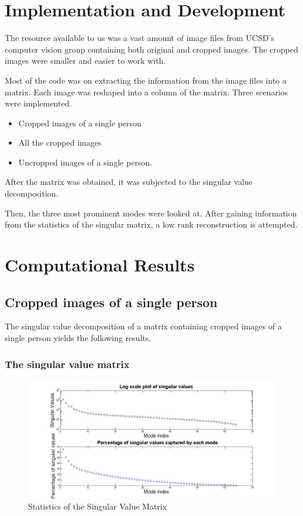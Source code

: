 \documentclass[a4paper]{article}
\begin{document}
\section{Implementation and Development}
The resource available to us was a vast amount of image files from UCSD's computer vision group containing both original and cropped images. The cropped images were smaller and easier to work with.

Most of the code was on extracting the information from the image files into a matrix. Each image was reshaped into a column of the matrix. Three scenarios were implemented.
\begin{itemize}
	\item Cropped images of a single person
	\item All the cropped images 
	\item Uncropped images of a single person. 
\end{itemize}

After the matrix was obtained, it was subjected to the singular value decomposition. 

Then, the three most prominent modes were looked at. After gaining information from the statistics of the singular matrix, a low rank reconstruction is attempted.





\section{Computational Results}

\subsection{Cropped images of a single person}
The singular value decomposition of a matrix containing cropped images of a single person yields the following results.

\subsubsection{The singular value matrix}
\begin{figure}[h!] 
	
	\includegraphics[width=1.\textwidth]{Crop1log.jpg}
	
	\caption{Statistics of the Singular Value Matrix}	
\end{figure}
\end{document}
